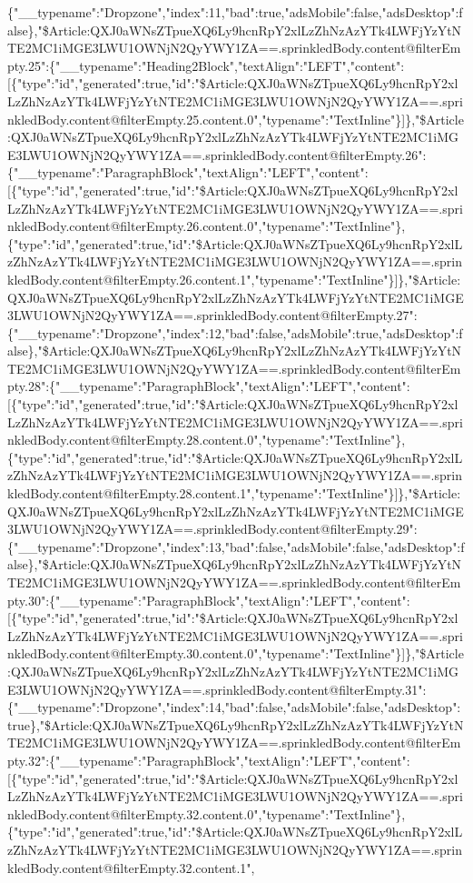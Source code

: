 \{"\_\_typename":"Dropzone","index":11,"bad":true,"adsMobile":false,"adsDesktop":false\},"\$Article:QXJ0aWNsZTpueXQ6Ly9hcnRpY2xlLzZhNzAzYTk4LWFjYzYtNTE2MC1iMGE3LWU1OWNjN2QyYWY1ZA==.sprinkledBody.content@filterEmpty.25":\{"\_\_typename":"Heading2Block","textAlign":"LEFT","content":{[}\{"type":"id","generated":true,"id":"\$Article:QXJ0aWNsZTpueXQ6Ly9hcnRpY2xlLzZhNzAzYTk4LWFjYzYtNTE2MC1iMGE3LWU1OWNjN2QyYWY1ZA==.sprinkledBody.content@filterEmpty.25.content.0","typename":"TextInline"\}{]}\},"\$Article:QXJ0aWNsZTpueXQ6Ly9hcnRpY2xlLzZhNzAzYTk4LWFjYzYtNTE2MC1iMGE3LWU1OWNjN2QyYWY1ZA==.sprinkledBody.content@filterEmpty.26":\{"\_\_typename":"ParagraphBlock","textAlign":"LEFT","content":{[}\{"type":"id","generated":true,"id":"\$Article:QXJ0aWNsZTpueXQ6Ly9hcnRpY2xlLzZhNzAzYTk4LWFjYzYtNTE2MC1iMGE3LWU1OWNjN2QyYWY1ZA==.sprinkledBody.content@filterEmpty.26.content.0","typename":"TextInline"\},\{"type":"id","generated":true,"id":"\$Article:QXJ0aWNsZTpueXQ6Ly9hcnRpY2xlLzZhNzAzYTk4LWFjYzYtNTE2MC1iMGE3LWU1OWNjN2QyYWY1ZA==.sprinkledBody.content@filterEmpty.26.content.1","typename":"TextInline"\}{]}\},"\$Article:QXJ0aWNsZTpueXQ6Ly9hcnRpY2xlLzZhNzAzYTk4LWFjYzYtNTE2MC1iMGE3LWU1OWNjN2QyYWY1ZA==.sprinkledBody.content@filterEmpty.27":\{"\_\_typename":"Dropzone","index":12,"bad":false,"adsMobile":true,"adsDesktop":false\},"\$Article:QXJ0aWNsZTpueXQ6Ly9hcnRpY2xlLzZhNzAzYTk4LWFjYzYtNTE2MC1iMGE3LWU1OWNjN2QyYWY1ZA==.sprinkledBody.content@filterEmpty.28":\{"\_\_typename":"ParagraphBlock","textAlign":"LEFT","content":{[}\{"type":"id","generated":true,"id":"\$Article:QXJ0aWNsZTpueXQ6Ly9hcnRpY2xlLzZhNzAzYTk4LWFjYzYtNTE2MC1iMGE3LWU1OWNjN2QyYWY1ZA==.sprinkledBody.content@filterEmpty.28.content.0","typename":"TextInline"\},\{"type":"id","generated":true,"id":"\$Article:QXJ0aWNsZTpueXQ6Ly9hcnRpY2xlLzZhNzAzYTk4LWFjYzYtNTE2MC1iMGE3LWU1OWNjN2QyYWY1ZA==.sprinkledBody.content@filterEmpty.28.content.1","typename":"TextInline"\}{]}\},"\$Article:QXJ0aWNsZTpueXQ6Ly9hcnRpY2xlLzZhNzAzYTk4LWFjYzYtNTE2MC1iMGE3LWU1OWNjN2QyYWY1ZA==.sprinkledBody.content@filterEmpty.29":\{"\_\_typename":"Dropzone","index":13,"bad":false,"adsMobile":false,"adsDesktop":false\},"\$Article:QXJ0aWNsZTpueXQ6Ly9hcnRpY2xlLzZhNzAzYTk4LWFjYzYtNTE2MC1iMGE3LWU1OWNjN2QyYWY1ZA==.sprinkledBody.content@filterEmpty.30":\{"\_\_typename":"ParagraphBlock","textAlign":"LEFT","content":{[}\{"type":"id","generated":true,"id":"\$Article:QXJ0aWNsZTpueXQ6Ly9hcnRpY2xlLzZhNzAzYTk4LWFjYzYtNTE2MC1iMGE3LWU1OWNjN2QyYWY1ZA==.sprinkledBody.content@filterEmpty.30.content.0","typename":"TextInline"\}{]}\},"\$Article:QXJ0aWNsZTpueXQ6Ly9hcnRpY2xlLzZhNzAzYTk4LWFjYzYtNTE2MC1iMGE3LWU1OWNjN2QyYWY1ZA==.sprinkledBody.content@filterEmpty.31":\{"\_\_typename":"Dropzone","index":14,"bad":false,"adsMobile":false,"adsDesktop":true\},"\$Article:QXJ0aWNsZTpueXQ6Ly9hcnRpY2xlLzZhNzAzYTk4LWFjYzYtNTE2MC1iMGE3LWU1OWNjN2QyYWY1ZA==.sprinkledBody.content@filterEmpty.32":\{"\_\_typename":"ParagraphBlock","textAlign":"LEFT","content":{[}\{"type":"id","generated":true,"id":"\$Article:QXJ0aWNsZTpueXQ6Ly9hcnRpY2xlLzZhNzAzYTk4LWFjYzYtNTE2MC1iMGE3LWU1OWNjN2QyYWY1ZA==.sprinkledBody.content@filterEmpty.32.content.0","typename":"TextInline"\},\{"type":"id","generated":true,"id":"\$Article:QXJ0aWNsZTpueXQ6Ly9hcnRpY2xlLzZhNzAzYTk4LWFjYzYtNTE2MC1iMGE3LWU1OWNjN2QyYWY1ZA==.sprinkledBody.content@filterEmpty.32.content.1",